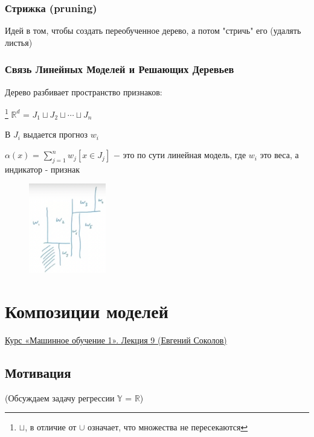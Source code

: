     \subsubsection{Стрижка (pruning)}
        Идей в том, чтобы создать переобученное дерево, а потом "стричь" его (удалять листья)

    \subsubsection{Связь Линейных Моделей и Решающих Деревьев}
    Дерево разбивает пространство признаков:
    \begin{center}
    \footnote{$\sqcup$, в отличие от $\cup$ означает, что множества не пересекаются} 
        $\mathbb{R}^d$ = $J_1 \sqcup J_2 \sqcup \cdots \sqcup J_n$ 
    \end{center}

    В $J_i$ выдается прогноз $w_i$

    \begin{center}
    \large
        $\alpha(x)$ = $\sum\limits_{j = 1}^nw_j[x \in J_j]$ $-$ это по сути линейная модель, где $w_i$ это веса, а индикатор - признак
    \end{center}

    \begin{figure}[H]
        \centering
        \includegraphics[width=0.3\textwidth]{images/8lecture/addition.png}
    \end{figure}

\newpage
\section{Композиции моделей}
    \href{https://www.youtube.com/watch?v=JkyTxNbiMn4&list=PLEqoHzpnmTfChItexxg2ZfxCsm-8QPsdS&index=11}{Курс «Машинное обучение 1». Лекция 9 (Евгений Соколов)}

    \subsection{Мотивация}
        \begin{center}
            (Обсуждаем задачу регрессии $\mathbb{Y}$ = $\mathbb{R}$)
        \end{center}
        
